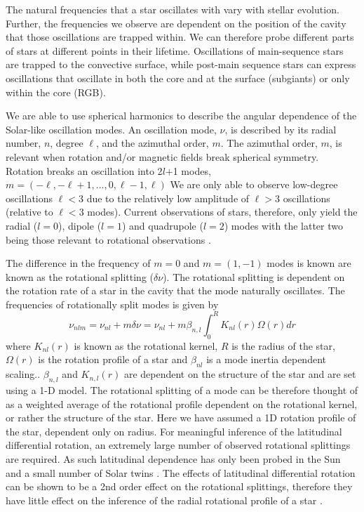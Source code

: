 The natural frequencies that a star oscillates with vary with stellar evolution.
Further, the frequencies we observe are dependent on the position of the cavity that those oscillations are trapped within.
We can therefore probe different parts of stars at different points in their lifetime.
Oscillations of main-sequence stars are trapped to the convective surface, while post-main sequence stars can express oscillations that oscillate in both the core and at the surface (subgiants) or only within the core (RGB).

We are able to use spherical harmonics to describe the angular dependence of the Solar-like oscillation modes. 
An oscillation mode, $\nu$, is described by its radial number, $n$, degree $\ell$, and the azimuthal order, $m$.
The azimuthal order, $m$, is relevant when rotation and/or magnetic fields break spherical symmetry. 
Rotation breaks an oscillation into 2$l$+1 modes, $m = (-\ell,-\ell+1,...,0,\ell-1,\ell)$
We are only able to observe low-degree oscillations $\ell<3$ due to the relatively low amplitude of $\ell>3$ oscillations (relative to $\ell<3$ modes). 
Current observations of stars, therefore, only yield the radial ($l=0$), dipole ($l=1$) and quadrupole ($l=2$) modes with the latter two being those relevant to rotational observations \citep{basu_asteroseismic_2017}.

The difference in the frequency of $m=0$ and $m=(1,-1)$ modes is known are known as the rotational splitting ($\delta \nu$).
The rotational splitting is dependent on the rotation rate of a star in the cavity that the mode naturally oscillates.
The frequencies of rotationally split modes is given by
\begin{equation}
\label{eq:rot_splot}
    \nu_{nlm} = \nu_{nl} + m \delta \nu = \nu_{nl} + m \beta_{n,l} \int^R_0 K_{nl}(r) \Omega(r) d r
\end{equation}
where $K_{nl}(r)$ is known as the rotational kernel, $R$ is the radius of the star, $\Omega(r)$ is the rotation profile of a star and $\beta_{nl}$ is a mode inertia dependent scaling.\citep{hansen_effects_1977,gough_solar_1981}.
$\beta_{n,l}$ and $K_{n,l}(r)$ are dependent on the structure of the star and are set using a 1-D model.
The rotational splitting of a mode can be therefore thought of as a weighted average of the rotational profile dependent on the rotational kernel, or rather the structure of the star. 
Here we have assumed a 1D rotation profile of the star, dependent only on radius.
For meaningful inference of the latitudinal differential rotation, an extremely large number of observed rotational splittings are required.
As such latitudinal dependence has only been probed in the Sun and a small number of Solar twins \citep{benomar_asteroseismic_2018}.
The effects of latitudinal differential rotation can be shown to be a 2nd order effect on the rotational splittings, therefore they have little effect on the inference of the radial rotational profile of a star \citep{gough_effect_1990,gough_seismic_1991,gough_inferring_1996}. 

